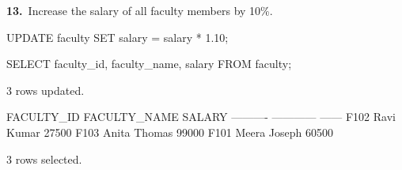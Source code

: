 \noindent\begin{minipage}{\linewidth}
\begingroup{}
{\fontsize{14}{17}\selectfont\textbf{13.}}\ Increase the salary of all faculty members by 10\%.\par
\endgroup\vspace{12pt}


\begin{sqlcode}
UPDATE faculty SET salary = salary * 1.10;

SELECT faculty_id, faculty_name, salary FROM faculty;
\end{sqlcode}

\vspace{18pt}


\begin{sqlout}[fontsize=\small]
3 rows updated.

FACULTY_ID  FACULTY_NAME  SALARY
----------  ------------  ------
F102        Ravi Kumar     27500
F103        Anita Thomas   99000
F101        Meera Joseph   60500

3 rows selected.
\end{sqlout}
\end{minipage}\par\vspace{24pt}

